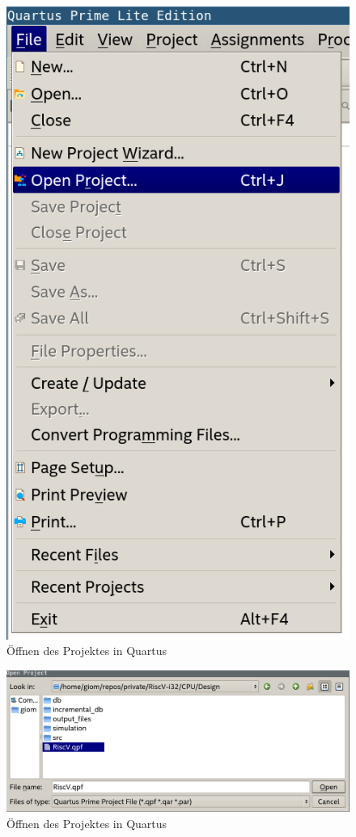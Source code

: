         \begin{figure}[H]
            \centering
            \includegraphics[scale=0.6]{img/quartus_open_project.png}
            \caption{Öffnen des Projektes in Quartus}
            \label{fig:quartus_open_project}
        \end{figure}

        \begin{figure}[H]
            \centering
            \includegraphics[scale=0.6]{img/quartus_select_project.png}
            \caption{Öffnen des Projektes in Quartus}
            \label{fig:quartus_select_project}
        \end{figure}


